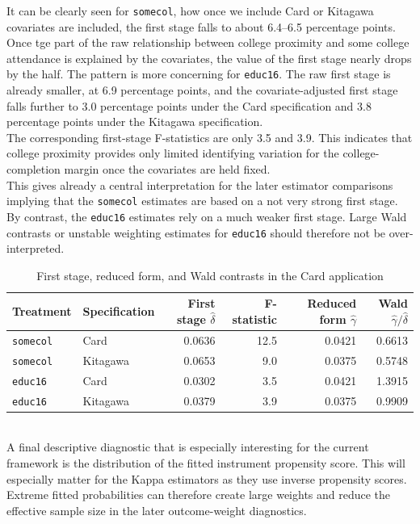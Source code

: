 \documentclass[12pt, a4paper, oneside]{article}
\theoremstyle{plain}
\theoremstyle{definition}
\begin{document}
It can be clearly seen for \texttt{somecol}, how once we include Card or Kitagawa covariates are included, the first stage falls to about 6.4--6.5 percentage points.
Once tge part of the raw relationship between college proximity and some college attendance is explained by the covariates, the value of the first stage nearly drops by the half.
The pattern is more concerning for \texttt{educ16}. The raw first stage is already smaller, at 6.9 percentage points, and the covariate-adjusted first stage falls further to 3.0 percentage points under the Card specification and 3.8 percentage points under the Kitagawa specification.\\
The corresponding first-stage F-statistics are only 3.5 and 3.9. This indicates that college proximity provides only limited identifying variation for the college-completion margin once the covariates are held fixed.\\
This gives already a central interpretation for the later estimator comparisons implying that the \texttt{somecol} estimates are based on a not very strong first stage. By contrast, the \texttt{educ16} estimates rely on a much weaker first stage. Large Wald contrasts or unstable weighting estimates for \texttt{educ16} should therefore not be over-interpreted.
\begin{table}[htbp]
\centering
\caption{First stage, reduced form, and Wald contrasts in the Card application}
\label{tab:card_first_stage_wald}
\begin{tabular}{llrrrr}
\toprule
Treatment & Specification & First stage $\hat{\delta}$ & F-statistic & Reduced form $\hat{\gamma}$ & Wald $\hat{\gamma}/\hat{\delta}$ \\
\midrule
\texttt{somecol} & Card     & 0.0636 & 12.5 & 0.0421 & 0.6613 \\
\texttt{somecol} & Kitagawa & 0.0653 &  9.0 & 0.0375 & 0.5748 \\
\texttt{educ16}  & Card     & 0.0302 &  3.5 & 0.0421 & 1.3915 \\
\texttt{educ16}  & Kitagawa & 0.0379 &  3.9 & 0.0375 & 0.9909 \\
\bottomrule
\end{tabular}
\end{table}
\\
A final descriptive diagnostic that is especially interesting for the current framework is the distribution of the fitted instrument propensity score. This will especially matter for the Kappa estimators as they use inverse propensity scores. Extreme fitted probabilities can therefore create large weights and reduce the effective sample size in the later outcome-weight diagnostics.
\end{document}
